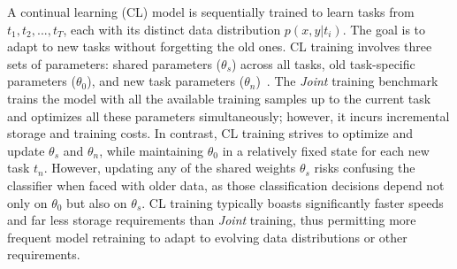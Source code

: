 

A continual learning (CL) model is sequentially trained to learn tasks from $t_1, t_2, ..., t_T$, each with its distinct data distribution $p(x,y|t_i)$. The goal is to adapt to new tasks without forgetting the old ones. CL training involves three sets of parameters: shared parameters ($\theta_{s}$) across all tasks, old task-specific parameters ($\theta_{0}$), and new task parameters ($\theta_{n}$)~\cite{lwf}. The {\em Joint} training benchmark trains the model with all the available training samples up to the current task and optimizes all these parameters simultaneously; however, it incurs incremental storage and training costs. In contrast, CL training strives to optimize and update $\theta_{s}$ and $\theta_{n}$, while maintaining $\theta_{0}$ in a relatively fixed state for each new task $t_{n}$. However, updating any of the shared weights $\theta_{s}$ risks confusing the classifier when faced with older data, as those classification decisions depend not only on $\theta_{0}$ but also on $\theta_{s}$. CL training typically boasts significantly faster speeds and far less storage requirements than {\em Joint} training, thus permitting more frequent model retraining to adapt to evolving data distributions or other requirements.




